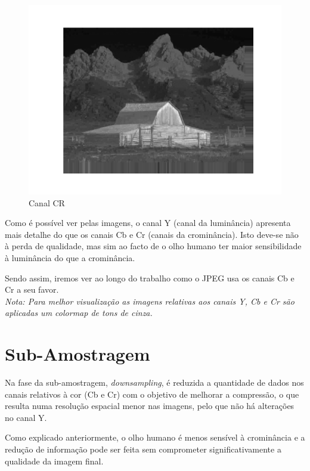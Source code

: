 \documentclass[a4paper, 12pt]{article}
\begin{document}
\begin{multicols}{3}
\begin{figure}[H]
                \includegraphics[width=\linewidth]{resources/Exercicio4/CR.png}
                \caption{\label{fig:my_label} Canal CR}
            \end{figure}
        \end{multicols}

        Como é possível ver pelas imagens, o canal Y (canal da luminância) apresenta mais detalhe do que
        os canais Cb e Cr (canais da crominância). Isto deve-se não à perda de qualidade, mas sim ao facto
        de o olho humano ter maior sensibilidade à luminância do que a crominância.

        Sendo assim, iremos ver ao longo do trabalho como o JPEG usa os canais Cb e Cr a seu favor.\\[8pt]
        
        \textit{Nota: Para melhor visualização as imagens relativas aos canais Y, Cb e Cr são aplicadas um \emph{colormap}
        de tons de cinza.}
        
\pagebreak
\section{Sub-Amostragem}
    Na fase da sub-amostragem, \emph{downsampling}, é reduzida a quantidade de dados nos canais relativos à cor (Cb
    e Cr) com o objetivo de melhorar a compressão, o que resulta numa resolução espacial menor nas imagens,
    pelo que não há alterações no canal Y. 
    
    Como explicado anteriormente, o olho humano é menos sensível à crominância e a redução de informação
    pode ser feita sem comprometer significativamente a qualidade da imagem final.
\end{document}

